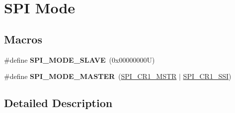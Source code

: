 \hypertarget{group___s_p_i___mode}{}\section{S\+PI Mode}
\label{group___s_p_i___mode}
\subsection*{Macros}
\begin{DoxyCompactItemize}
\item 
\mbox{\label{group___s_p_i___mode_ga75f094fee5a9dc10b88401ccd17925d3}} 
\#define {\bfseries S\+P\+I\+\_\+\+M\+O\+D\+E\+\_\+\+S\+L\+A\+VE}~(0x00000000\+U)
\item 
\mbox{\label{group___s_p_i___mode_gaa335c2abdfad9e6f6c2677719d93b64e}} 
\#define {\bfseries S\+P\+I\+\_\+\+M\+O\+D\+E\+\_\+\+M\+A\+S\+T\+ER}~(\hyperlink{group___peripheral___registers___bits___definition_ga5b3b6ae107fc37bf18e14506298d7a55}{S\+P\+I\+\_\+\+C\+R1\+\_\+\+M\+S\+TR} $\vert$ \hyperlink{group___peripheral___registers___bits___definition_ga5f154374b58c0234f82ea326cb303a1e}{S\+P\+I\+\_\+\+C\+R1\+\_\+\+S\+SI})
\end{DoxyCompactItemize}


\subsection{Detailed Description}
